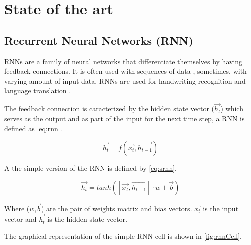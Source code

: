 \section{State of the art}\label{sec:state}

\subsection{Recurrent Neural Networks (RNN)}

RNNs are a family of neural networks that differentiate themselves by having feedback connections. It is often used with sequences of data \cite{rnn}, sometimes, with varying amount of input data. RNNs are used for handwriting recognition and language translation \cite{gru}.

The feedback connection is caracterized by the hidden state vector ($\overrightarrow{h_t}$) which serves as the output and as part of the input for the next time step, a RNN is defined as \cref{eq:rnn}.

\begin{equation}\label{eq:rnn}
  \overrightarrow{h_t}=f(\overrightarrow{x_t},\overrightarrow{h_{t-1}})
\end{equation}

A the simple version of the RNN is defined by \cref{eq:srnn}.

\begin{equation}\label{eq:srnn}
  \overrightarrow{h_t}=tanh([\overrightarrow{x_t},\overrightarrow{h_{t-1}}]\cdot w + \overrightarrow{b})
\end{equation}

Where ($w$,$\overrightarrow{b}$) are the pair of weights matrix and bias vectors. $\overrightarrow{x_t}$ is the input vector and $\overrightarrow{h_t}$ is the hidden state vector.

The graphical representation of the simple RNN cell is shown in \cref{fig:rnnCell}.

\begin{figure}[t]
  \centering
  \begin{minipage}{\columnwidth}
  \end{minipage}
  \begin{minipage}{\columnwidth}
  \end{minipage}
  \caption{}
\end{figure}

